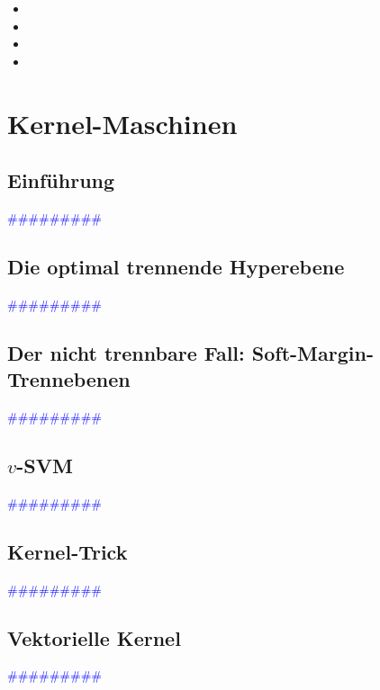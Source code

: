 \documentclass{article}
\begin{document}
      \begin{itemize}
      \color{red}
        \item
        \item
      \color{ForestGreen}
        \item
        \item
      \end{itemize}




\newpage
\section{Kernel-Maschinen} %
  \subsection{Einführung} %
      \textcolor{blue}{\#\#\#\#\#\#\#\#\#}
  \subsection{Die optimal trennende Hyperebene} %
      \textcolor{blue}{\#\#\#\#\#\#\#\#\#}
  \subsection{Der nicht trennbare Fall: Soft-Margin-Trennebenen} %
      \textcolor{blue}{\#\#\#\#\#\#\#\#\#}
  \subsection{$v$-SVM} %
      \textcolor{blue}{\#\#\#\#\#\#\#\#\#}
  \subsection{Kernel-Trick} %
      \textcolor{blue}{\#\#\#\#\#\#\#\#\#}
  \subsection{Vektorielle Kernel} %
      \textcolor{blue}{\#\#\#\#\#\#\#\#\#}
\end{document}
